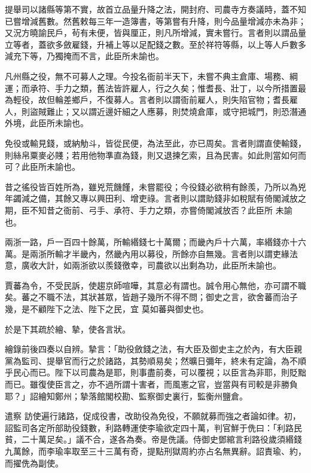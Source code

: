 \begin{pinyinscope}
 提舉司以諸縣等第不實，故首立品量升降之法，開封府、司農寺方奏議時，蓋不知已嘗增減舊數。然舊敕每三年一造簿書，等第嘗有升降，則今品量增減亦未為非；又況方曉諭民戶，茍有未便，皆與厘正，則凡所增減，實未嘗行。言者則以謂品量
 立等者，蓋欲多斂雇錢，升補上等以足配錢之數。至於祥符等縣，以上等人戶數多減充下等，乃獨掩而不言，此臣所未諭也。



 凡州縣之役，無不可募人之理。今投名衙前半天下，未嘗不典主倉庫、場務、綱運；而承符、手力之類，舊法皆許雇人，行之久矣；惟耆長、壯丁，以今所措置最為輕役，故但輪差鄉戶，不復募人。言者則以謂衙前雇人，則失陷官物；耆長雇人，則盜賊難止；又以謂近邊奸細之人應募，則焚燒倉庫，或守把城門，則恐潛通
 外境，此臣所未諭也。



 免役或輸見錢，或納觔斗，皆從民便，為法至此，亦已周矣。言者則謂直使輸錢，則絲帛粟麥必賤；若用他物準直為錢，則又退揀乞索，且為民害。如此則當如何而可？此臣所未諭也。



 昔之徭役皆百姓所為，雖兇荒饑饉，未嘗罷役；今役錢必欲稍有餘羨，乃所以為兇年蠲減之備，其餘又專以興田利、增吏祿。言者則以謂助錢非如稅賦有倚閣減放之期，臣不知昔之衙前、弓手、承符、手力之類，亦嘗倚閣減放否？此臣所
 未諭也。



 兩浙一路，戶一百四十餘萬，所輸緡錢七十萬爾；而畿內戶十六萬，率緡錢亦十六萬。是兩浙所輸才半畿內，然畿內用以募役，所餘亦自無幾。言者則以謂吏緣法意，廣收大計，如兩浙欲以羨錢徼幸，司農欲以出剩為功，此臣所未諭也。



 賈蕃為令，不受民訴，使趨京師喧嘩，其意必有謂也。誠令用心無他，亦可謂不職矣。蕃之不職不法，其狀甚眾，皆趙子幾所不得不問；御史之言，欲舍蕃而治子幾，是不顧陛下之法、陛下之民，宜
 莫如蕃與御史也。



 於是下其疏於繪、摯，使各言狀。



 繪錄前後四奏以自辨。摯言：「助役斂錢之法，有大臣及御史主之於內，有大臣親黨為監司、提舉官而行之於諸路，其勢順易矣；然曠日彌年，終未有定論，為不順乎民心而已。陛下以司農為是耶，則事盡前奏，可以覆視；以臣言為非耶，則貶黜而已。雖復使臣言之，亦不過所謂十害者，而風憲之官，豈當與有司較是非勝負耶？」詔繪知鄭州；摯落館閣校勘、監察御史裏行，監衡州鹽倉。



 遣察
 訪使遍行諸路，促成役書，改助役為免役，不願就募而強之者論如律。初，詔監司各定所部助役錢數，利路轉運使李瑜欲定四十萬，判官鮮于侁曰：「利路民貧，二十萬足矣。」議不合，遂各為奏。帝是侁議。侍御史鄧綰言利路役歲須緡錢九萬餘，而李瑜率取至三十三萬有奇，提點刑獄周約亦占名無異辭。詔責瑜、約，而擢侁為副使。




\end{pinyinscope}
